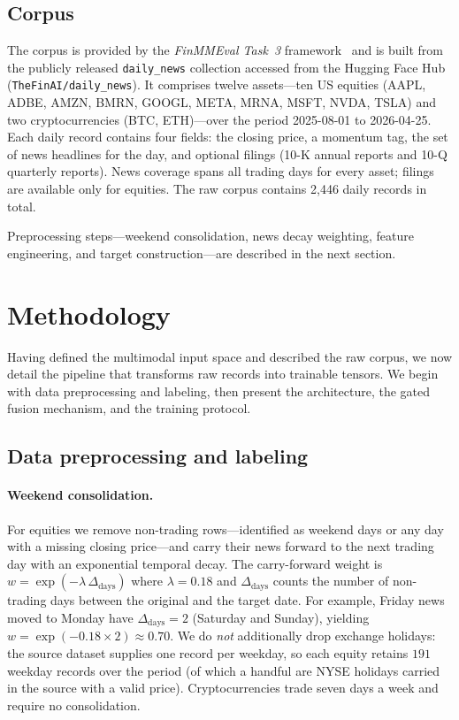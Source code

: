 \documentclass[runningheads]{llncs}
\begin{document}
\subsection{Corpus}
The corpus is provided by the \emph{FinMMEval Task~3} framework~\cite{qian2025agents} and is built from
the publicly released \texttt{daily\_news} collection accessed from the Hugging
Face Hub (\texttt{TheFinAI/daily\_news}). It comprises twelve assets---ten US equities (AAPL, ADBE, AMZN,
BMRN, GOOGL, META, MRNA, MSFT, NVDA, TSLA) and two cryptocurrencies (BTC,
ETH)---over the period 2025-08-01 to 2026-04-25. Each daily record contains four fields: the closing price, a momentum tag, the set of news headlines for the day, and optional filings (10-K annual reports and 10-Q quarterly reports). News coverage spans all trading days for every asset; filings are available only for equities. The raw corpus contains 2{,}446 daily records in total.

Preprocessing steps---weekend consolidation, news decay weighting, feature engineering, and target construction---are described in the next section.

\section{Methodology}
Having defined the multimodal input space and described the raw corpus, we now
detail the pipeline that transforms raw records into trainable tensors. We begin
with data preprocessing and labeling, then present the architecture, the gated
fusion mechanism, and the training protocol.

\subsection{Data preprocessing and labeling}

\paragraph{Weekend consolidation.}
For equities we remove non-trading rows---identified as weekend days or any day
with a missing closing price---and carry their news forward to the next trading
day with an exponential temporal decay. The carry-forward weight is
$w = \exp(-\lambda\,\Delta_{\text{days}})$ where $\lambda = 0.18$ and
$\Delta_{\text{days}}$ counts the number of non-trading days between the original
and the target date. For example, Friday news moved to Monday have
$\Delta_{\text{days}} = 2$ (Saturday and Sunday), yielding
$w = \exp(-0.18 \times 2) \approx 0.70$. We do \emph{not} additionally drop
exchange holidays: the source dataset supplies one record per weekday, so each
equity retains $191$ weekday records over the period (of which a handful are
NYSE holidays carried in the source with a valid price). Cryptocurrencies trade
seven days a week and require no consolidation.
\end{document}
